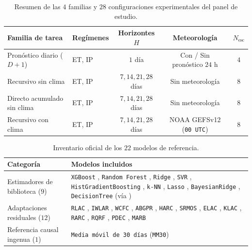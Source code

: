 \begin{table}[!htbp]
\caption{Resumen de las $4$ familias y $28$ configuraciones experimentales del panel de estudio.}\label{tab:escenarios28}
\scriptsize
\begin{tabular}{@{}llccc@{}}
\toprule
Familia de tarea & Regímenes & Horizontes $H$ & Meteorología & $N_{\text{esc}}$ \\
\midrule
Pronóstico diario ($D+1$) & ET, IP & $1$ día & Con / Sin pronóstico $24\text{ h}$ & $4$ \\
Recursivo sin clima & ET, IP & $7, 14, 21, 28$ días & Sin meteorología & $8$ \\
Directo acumulado sin clima & ET, IP & $7, 14, 21, 28$ días & Sin meteorología & $8$ \\
Recursivo con clima & ET, IP & $7, 14, 21, 28$ días & NOAA GEFSv12 (\texttt{00 UTC}) & $8$ \\
\bottomrule
\end{tabular}
\end{table}

\begin{table}[!htbp]
\caption{Inventario oficial de los $22$ modelos de referencia.}\label{tab:benchmarks22}
\scriptsize
\begin{tabular}{@{}lp{9.2cm}@{}}
\toprule
Categoría & Modelos incluidos \\
\midrule
Estimadores de biblioteca ($9$) & \texttt{XGBoost} \cite{chen2016}, \texttt{Random Forest} \cite{breiman2001}, \texttt{Ridge} \cite{hoerl1970}, \texttt{SVR} \cite{drucker1997svr}, \texttt{HistGradientBoosting} \cite{friedman2001gbm}, \texttt{k-NN} \cite{cover1967nearest}, \texttt{Lasso} \cite{tibshirani1996}, \texttt{BayesianRidge} \cite{mackay1992}, \texttt{DecisionTree} \cite{breiman1984cart} (vía \cite{pedregosa2011sklearn}) \\
Adaptaciones residuales ($12$) & \texttt{RLAC} \cite{hoerl1970}, \texttt{IWLAR} \cite{cleveland1979robust,atkeson1997locally}, \texttt{WCFC} \cite{bates1969combination,huber1964,hoerl1970}, \texttt{ABGPR} \cite{rasmussen2006gpml}, \texttt{HARC} \cite{laird1982random,hoerl1970}, \texttt{SRMOS} \cite{glahn1972mos}, \texttt{ELAC} \cite{brown1959statistical}, \texttt{KLAC} \cite{kalman1960approach,harvey1989forecasting}, \texttt{RARC} \cite{huber1964}, \texttt{RQRF} \cite{koenker1978quantiles,meinshausen2006}, \texttt{PDEC} \cite{hyndman2021fpp3,hoerl1970}, \texttt{MARB} \cite{chen2016} \\
Referencia causal ingenua ($1$) & \texttt{Media móvil de 30 días} (\texttt{MM30}) \\
\bottomrule
\end{tabular}
\end{table}
